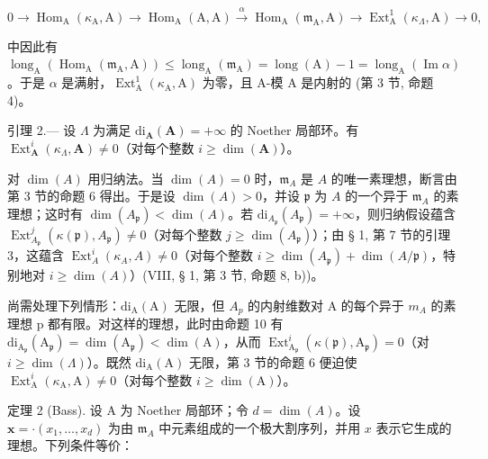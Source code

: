 \[
0 \to \operatorname{Hom} _ {\mathrm{A}} (\kappa_ {\mathrm{A}}, \mathrm{A}) \longrightarrow \operatorname{Hom} _ {\mathrm{A}} (\mathrm{A}, \mathrm{A}) \stackrel {{\alpha}} {{\longrightarrow}} \operatorname{Hom} _ {\mathrm{A}} (\mathfrak {m} _ {\mathrm{A}}, \mathrm{A}) \longrightarrow \operatorname{Ext} _ {\mathrm{A}} ^ {1} (\kappa_ {\Lambda}, \mathrm{A}) \to 0,
\]

中因此有 \(\operatorname{long}_{\mathrm{A}}(\operatorname{Hom}_{\mathrm{A}}(\mathfrak{m}_{\mathrm{A}},\mathrm{A})) \leqslant \operatorname{long}_{\mathrm{A}}(\mathfrak{m}_{\mathrm{A}}) = \operatorname{long}(\mathrm{A}) - 1 = \operatorname{long}_{\mathrm{A}}(\operatorname{Im}\alpha)\) 。于是 \(\alpha\) 是满射，\(\operatorname{Ext}_{\mathrm{A}}^{1}(\kappa_{\mathrm{A}},\mathrm{A})\) 为零，且 A-模 A 是内射的 (第 3 节, 命题 4)。

引理 2.--- 设 \(\Lambda\) 为满足 \(\mathrm{di}_{\mathbf{A}}(\mathbf{A}) = +\infty\) 的 Noether 局部环。有 \(\operatorname{Ext}_{\mathbf{A}}^{i}(\kappa_{\Lambda}, \mathbf{A}) \neq 0\)（对每个整数 \(i \geqslant \dim(\mathbf{A})\)）。

对 \(\dim(A)\) 用归纳法。当 \(\dim(A) = 0\) 时，\(\mathfrak{m}_A\) 是 \(A\) 的唯一素理想，断言由第 3 节的命题 6 得出。于是设 \(\dim(A) > 0\)，并设 \(\mathfrak{p}\) 为 \(A\) 的一个异于 \(\mathfrak{m}_A\) 的素理想；这时有 \(\dim(A_{\mathfrak{p}}) < \dim(A)\)。若 \(\mathrm{di}_{A_{\mathfrak{p}}}(A_{\mathfrak{p}}) = +\infty\)，则归纳假设蕴含 \(\operatorname{Ext}_{A_{\mathfrak{p}}}^{j}(\kappa(\mathfrak{p}), A_{\mathfrak{p}}) \neq 0\)（对每个整数 \(j \geqslant \dim(A_{\mathfrak{p}})\)）；由 § 1, 第 7 节的引理 3，这蕴含 \(\operatorname{Ext}_{A}^{i}(\kappa_{A}, A) \neq 0\)（对每个整数 \(i \geqslant \dim(A_{\mathfrak{p}}) + \dim(A/\mathfrak{p})\)，特别地对 \(i \geqslant \dim(A)\)）(VIII, § 1, 第 3 节, 命题 8, b))。

尚需处理下列情形：\(\mathrm{di}_{\mathrm{A}}(\mathrm{A})\) 无限，但 \(A_{p}\) 的内射维数对 A 的每个异于 \(m_{A}\) 的素理想 p 都有限。对这样的理想，此时由命题 10 有 \(\mathrm{di}_{\mathrm{A}_{\mathfrak{p}}}(\mathrm{A}_{\mathfrak{p}})=\dim(\mathrm{A}_{\mathfrak{p}})<\dim(\mathrm{A})\)，从而 \(\operatorname{Ext}_{\mathrm{A}_{\mathfrak{p}}}^{i}(\kappa(\mathfrak{p}),\mathrm{A}_{\mathfrak{p}})=0\)（对 \(i\geqslant\dim(\Lambda)\)）。既然 \(\mathrm{di}_{\mathrm{A}}(\mathrm{A})\) 无限，第 3 节的命题 6 便迫使 \(\operatorname{Ext}_{\mathrm{A}}^{i}(\kappa_{\mathrm{A}},\mathrm{A})\neq0\)（对每个整数 \(i\geqslant\dim(\mathrm{A})\)）。

定理 2 (Bass). 设 A 为 Noether 局部环；令 \(d = \dim(A)\)。设 \(\mathbf{x} = \cdot(x_1, \ldots, x_d)\) 为由 \(\mathfrak{m}_A\) 中元素组成的一个极大割序列，并用 \(x\) 表示它生成的理想。下列条件等价：

